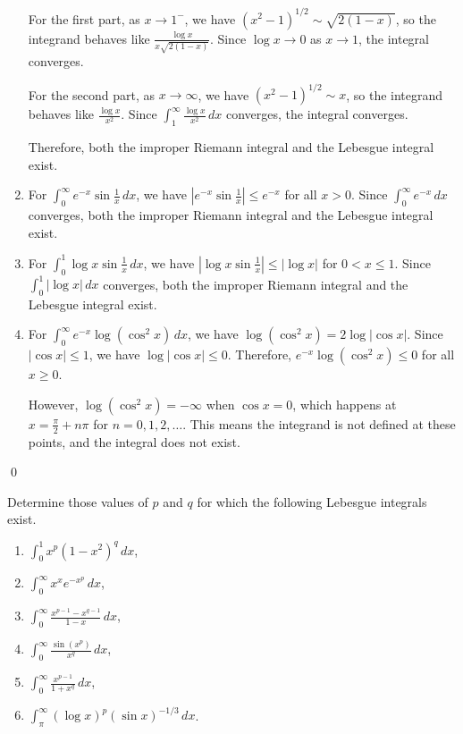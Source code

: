 \begin{enumerate}[label=(\alph*)]
For the first part, as $x \to 1^-$, we have $(x^2 - 1)^{1/2} \sim \sqrt{2(1-x)}$, so the integrand behaves like $\frac{\log x}{x\sqrt{2(1-x)}}$. Since $\log x \to 0$ as $x \to 1$, the integral converges.

For the second part, as $x \to \infty$, we have $(x^2 - 1)^{1/2} \sim x$, so the integrand behaves like $\frac{\log x}{x^2}$. Since $\int_{1}^{\infty} \frac{\log x}{x^2} \, dx$ converges, the integral converges.

Therefore, both the improper Riemann integral and the Lebesgue integral exist.

\item For $\int_{0}^{\infty} e^{-x} \sin \frac{1}{x} \, dx$, we have $|e^{-x} \sin \frac{1}{x}| \leq e^{-x}$ for all $x > 0$. Since $\int_{0}^{\infty} e^{-x} \, dx$ converges, both the improper Riemann integral and the Lebesgue integral exist.

\item For $\int_{0}^{1} \log x \sin \frac{1}{x} \, dx$, we have $|\log x \sin \frac{1}{x}| \leq |\log x|$ for $0 < x \leq 1$. Since $\int_{0}^{1} |\log x| \, dx$ converges, both the improper Riemann integral and the Lebesgue integral exist.

\item For $\int_{0}^{\infty} e^{-x} \log (\cos^2 x) \, dx$, we have $\log (\cos^2 x) = 2 \log |\cos x|$. Since $|\cos x| \leq 1$, we have $\log |\cos x| \leq 0$. Therefore, $e^{-x} \log (\cos^2 x) \leq 0$ for all $x \geq 0$.

However, $\log (\cos^2 x) = -\infty$ when $\cos x = 0$, which happens at $x = \frac{\pi}{2} + n\pi$ for $n = 0, 1, 2, \ldots$. This means the integrand is not defined at these points, and the integral does not exist.
\end{enumerate}\qed


\begin{problembox}
Determine those values of $p$ and $q$ for which the following Lebesgue integrals exist.
\begin{enumerate}[label=(\alph*)]
\item $\int_{0}^{1} x^p (1 - x^2)^q \, dx$,
\item $\int_{0}^{\infty} x^x e^{-x^p} \, dx$,
\item $\int_{0}^{\infty} \frac{x^{p-1} - x^{q-1}}{1 - x} \, dx$,
\item $\int_{0}^{\infty} \frac{\sin(x^p)}{x^q} \, dx$,
\item $\int_{0}^{\infty} \frac{x^{p-1}}{1 + x^q} \, dx$,
\item $\int_{\pi}^{\infty} (\log x)^p (\sin x)^{-1/3} \, dx$.
\end{enumerate}
\end{problembox}

